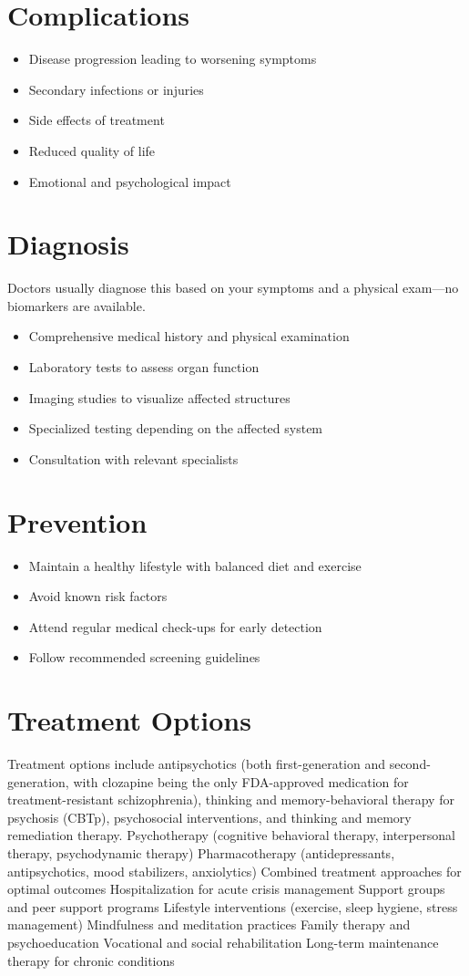 \section{Complications}
\begin{itemize}[noitemsep]
  \item Disease progression leading to worsening symptoms
  \item Secondary infections or injuries
  \item Side effects of treatment
  \item Reduced quality of life
  \item Emotional and psychological impact
\end{itemize}
\section{Diagnosis}
Doctors usually diagnose this based on your symptoms and a physical exam---no biomarkers are available.

\begin{itemize}[noitemsep]
  \item Comprehensive medical history and physical examination
  \item Laboratory tests to assess organ function
  \item Imaging studies to visualize affected structures
  \item Specialized testing depending on the affected system
  \item Consultation with relevant specialists
\end{itemize}
\section{Prevention}
\begin{itemize}[noitemsep]
  \item Maintain a healthy lifestyle with balanced diet and exercise
  \item Avoid known risk factors
  \item Attend regular medical check-ups for early detection
  \item Follow recommended screening guidelines
\end{itemize}
\section{Treatment Options}
Treatment options include antipsychotics (both first-generation and second-generation, with clozapine being the only FDA-approved medication for treatment-resistant schizophrenia), thinking and memory-behavioral therapy for psychosis (CBTp), psychosocial interventions, and thinking and memory remediation therapy. Psychotherapy (cognitive behavioral therapy, interpersonal therapy, psychodynamic therapy) Pharmacotherapy (antidepressants, antipsychotics, mood stabilizers, anxiolytics) Combined treatment approaches for optimal outcomes Hospitalization for acute crisis management Support groups and peer support programs Lifestyle interventions (exercise, sleep hygiene, stress management) Mindfulness and meditation practices Family therapy and psychoeducation Vocational and social rehabilitation Long-term maintenance therapy for chronic conditions

